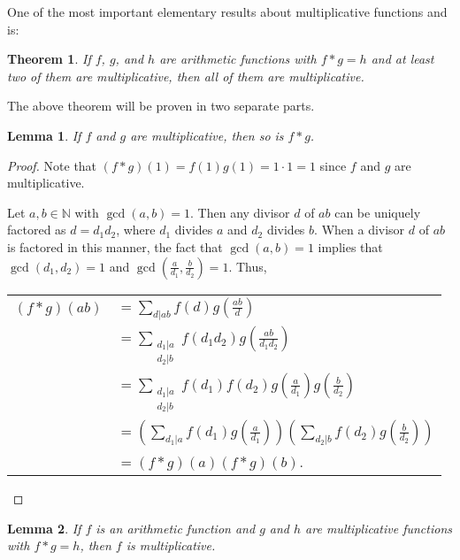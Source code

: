 \documentclass[12pt]{article}
\newtheorem*{thm*}{Theorem}
\newtheorem{lem}{Lemma}
\begin{document}

One of the most important elementary results about multiplicative functions and  is:

\begin{thm*}
If $f$, $g$, and $h$ are arithmetic functions with $f*g=h$ and at least two of them are multiplicative, then all of them are multiplicative.
\end{thm*}

The above theorem will be proven in two separate parts.

\begin{lem}
If $f$ and $g$ are multiplicative, then so is $f*g$.
\end{lem}

\begin{proof}
Note that $\displaystyle (f*g)(1)=f(1)g(1)=1 \cdot 1=1$ since $f$ and $g$ are multiplicative.

Let $a,b \in \mathbb{N}$ with $\gcd(a,b)=1$.  Then any divisor $d$ of $ab$ can be uniquely factored as $d=d_1d_2$, where $d_1$ divides $a$ and $d_2$ divides $b$.  When a divisor $d$ of $ab$ is factored in this manner, the fact that $\gcd(a,b)=1$ implies that $\gcd(d_1,d_2)=1$ and $\displaystyle \gcd \left( \frac{a}{d_1}, \frac{b}{d_2} \right)=1$.  Thus,

\begin{center}
\begin{tabular}{ll}
$(f*g)(ab)$ & $\displaystyle =\sum_{d|ab} f(d) g\left( \frac{ab}{d} \right)$ \\
& $\displaystyle =\sum_{\substack{d_1|a \\ d_2|b}} f(d_1d_2) g\left( \frac{ab}{d_1d_2} \right)$ \\
& $\displaystyle =\sum_{\substack{d_1|a \\ d_2|b}} f(d_1)f(d_2) g\left( \frac{a}{d_1} \right) g\left( \frac{b}{d_2} \right)$ \\
& $\displaystyle =\left( \sum_{d_1|a} f(d_1) g\left( \frac{a}{d_1} \right) \right) \left( \sum_{d_2|b} f(d_2) g\left( \frac{b}{d_2} \right) \right)$ \\
& $\displaystyle =(f*g)(a)(f*g)(b)$. \end{tabular}
\end{center}
\end{proof}

\begin{lem}
If $f$ is an arithmetic function and $g$ and $h$ are multiplicative functions with $f*g=h$, then $f$ is multiplicative.
\end{lem}
\end{document}
